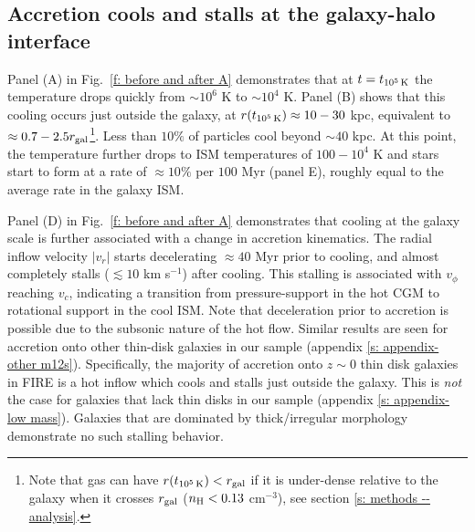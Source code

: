 \documentclass[fleqn,usenatbib]{mnras}
\newcommand{\tcon}{t_{10^5\,{\rm K}}}
\begin{document}
\subsection{Accretion cools and stalls at the galaxy-halo interface}
\label{s: characteristics -- cools}

Panel (A) in Fig.~\ref{f: before and after A} demonstrates that at $t = \tcon$ the temperature drops quickly from $\sim10^6$ K to $\sim10^4$ K.
Panel (B) shows that this cooling occurs just outside the galaxy, at $r(\tcon) \approx 10-30$ kpc, equivalent to $\approx0.7 - 2.5 r_{\rm gal}$\footnote{Note that gas can have $r(\tcon) < r_{\rm gal}$ if it is under-dense relative to the galaxy when it crosses $r_{\rm gal}$ ($n_{\rm H} < 0.13$ cm$^{-3}$), see section \ref{s: methods -- analysis}.}.
Less than $10\%$ of particles cool beyond $\sim 40$ kpc.
At this point, the temperature further drops to ISM temperatures of $100-10^4$ K and stars start to form at a rate of $\approx10\%$ per $100$ Myr (panel E), roughly equal to the average rate in the galaxy ISM. 

Panel (D) in Fig.~\ref{f: before and after A} demonstrates that cooling at the galaxy scale is further associated with a change in accretion kinematics.
The radial inflow velocity $\vert v_r \vert $ starts decelerating $\approx40$ Myr prior to cooling, and almost completely stalls ($\lesssim10$ km s$^{-1}$) after cooling.
This stalling is associated with $v_\phi$ reaching $v_c$, indicating a transition from pressure-support in the hot CGM to rotational support in the cool ISM.
Note that deceleration prior to accretion is possible due to the subsonic nature of the hot flow.
Similar results are seen for accretion onto other thin-disk galaxies in our sample (appendix \ref{s: appendix-other m12s}). 
Specifically, the majority of accretion onto $z\sim0$ thin disk galaxies in FIRE is a hot inflow which cools and stalls just outside the galaxy.
This is {\em not} the case for galaxies that lack thin disks in our sample (appendix \ref{s: appendix-low mass}).
Galaxies that are dominated by thick/irregular morphology demonstrate no such stalling behavior.
\end{document}
